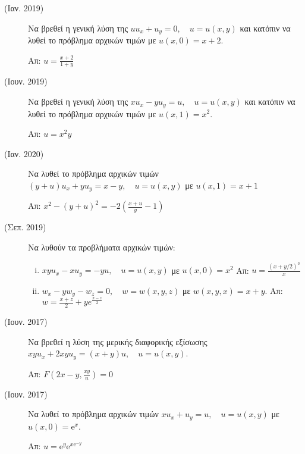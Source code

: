 



\thispagestyle{askhseis}



\begin{center}
  \minibox{\large\bfseries \textcolor{Col1}{ΜΔΕ 1ης τάξης (Θέματα)}}
\end{center}

\vspace{\baselineskip}

\begin{description}
  \item [(Ιαν. 2019)] Να βρεθεί η γενική λύση της $ uu_{x}+u_{y}=0, \quad u=u(x,y) $ 
    και κατόπιν να λυθεί το πρόβλημα αρχικών τιμών με $ u(x,0)=x+2 $.

    \hfill Απ: $ u= \frac{x+2}{1+y} $ 

  \item [(Ιουν. 2019)] Να βρεθεί η γενική λύση της $ xu_{x}-yu_{y}=u, \quad u=u(x,y) $ 
    και κατόπιν να λυθεί το πρόβλημα αρχικών τιμών με $ u(x,1)=x^{2} $.

    \hfill Απ: $ u=x^{2}y $ 

  \item [(Ιαν. 2020)] Να λυθεί το πρόβλημα αρχικών τιμών $ (y+u)u_{x}+yu_{y}=x-y, 
    \quad u=u(x,y) $ με $ u(x,1)=x+1 $

    \hfill Απ: $ x^{2}-(y+u)^{2} = -2 (\frac{x+u}{y} -1) $ 

  \item [(Σεπ. 2019)] Να λυθούν τα προβλήματα αρχικών τιμών:
    \begin{enumerate}[i)]
      \item $ xyu_{x}-xu_{y}=-yu, \quad u=u(x,y) $ με $ u(x,0)=x^{2} $ 
        \hfill Απ: $ u= \frac{(x+y/2)^{3}}{x} $
      \item $ w_{x}-yw_{y}-w_{z}=0, \quad w=w(x,y,z) $ με $ w(x,y,x)=x+y $.
        \hfill Απ: $ w= \frac{x+z}{2} + ye^{\frac{x-z}{2}} $ 
    \end{enumerate}

  \item [(Ιουν. 2017)] Να βρεθεί η λύση της μερικής διαφορικής εξίσωσης 
    $ xyu_{x}+2xyu_{y}=(x+y)u, \quad u=u(x,y) $.

    \hfill Απ: $ F(2x-y, \frac{xy}{u}) = 0 $ 

  \item [(Ιουν. 2017)] Να λυθεί το πρόβλημα αρχικών τιμών 
    $x u_{x} + u_{y}=u, \quad u=u(x,y) $ με $ u(x,0)= \mathrm{e}^{x} $.

    \hfill Απ: $ u= \mathrm{e}^{y} \mathrm{e}^{x\mathrm{e}^{-y}} $  
\end{description}


